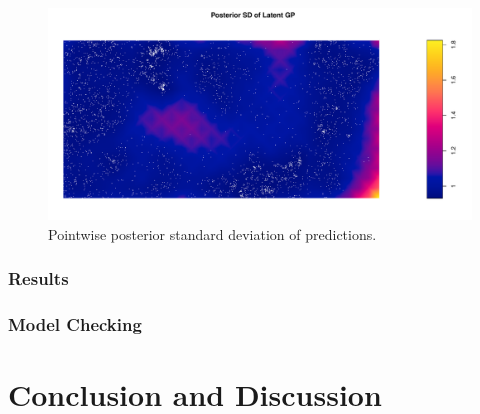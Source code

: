 \documentclass[]{interact}
\begin{document}
\begin{figure}[h]
\includegraphics[width=\textwidth]{figures/beisd.pdf}
\caption{Pointwise posterior standard deviation of predictions.}
\label{beisd}
\end{figure}


\subsubsection{Results}


\subsubsection{Model Checking}


\section{Conclusion and Discussion}




\end{document}

